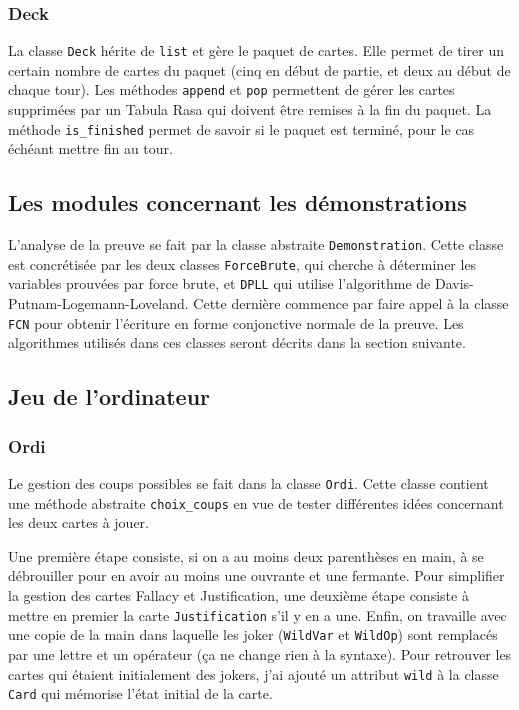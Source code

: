 \documentclass[12pt, algo]{cours}
\begin{document}
\subsubsection{Deck}

La classe \texttt{Deck} hérite de \texttt{list} et gère le paquet de cartes. Elle permet de tirer un certain nombre de cartes du paquet (cinq en début de partie, et deux au début de chaque tour). Les méthodes \texttt{append} et \texttt{pop} permettent de gérer les cartes supprimées par un Tabula Rasa qui doivent être remises à la fin du paquet. La méthode \texttt{is\_finished} permet de savoir si le paquet est terminé, pour le cas échéant mettre fin au tour.

\subsection{Les modules concernant les démonstrations}

L'analyse de la preuve se fait par la classe abstraite \texttt{Demonstration}. Cette classe est concrétisée par les deux classes \texttt{ForceBrute}, qui cherche à déterminer les \og variables prouvées \fg par force brute, et \texttt{DPLL} qui utilise l'algorithme de Davis-Putnam-Logemann-Loveland. Cette dernière commence par faire appel à la classe \texttt{FCN} pour obtenir l'écriture en forme conjonctive normale de la preuve. Les algorithmes utilisés dans ces classes seront décrits dans la section suivante.

\subsection{Jeu de l'ordinateur}

\subsubsection{Ordi}

Le gestion des coups possibles se fait dans la classe \texttt{Ordi}. Cette classe contient une méthode abstraite \texttt{choix\_coups} en vue de tester différentes idées concernant les deux cartes à jouer.

Une première étape consiste, si on a au moins deux parenthèses en main, à se débrouiller pour en avoir au moins une ouvrante et une fermante. Pour simplifier la gestion des cartes Fallacy et Justification, une deuxième étape consiste à mettre en premier la carte \texttt{Justification} s'il y en a une. Enfin, on travaille avec une copie de la main dans laquelle les joker (\texttt{WildVar} et \texttt{WildOp}) sont remplacés par une lettre et un opérateur (ça ne change rien à la syntaxe). Pour retrouver les cartes qui étaient initialement des jokers, j'ai ajouté un attribut \texttt{wild} à la classe \texttt{Card} qui mémorise l'état initial de la carte.
\end{document}
